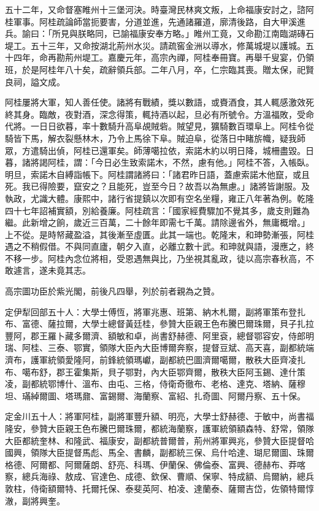 \begin{pinyinscope}
五十二年，又命督塞睢州十三堡河決。時臺灣民林爽文叛，上命福康安討之，諮阿桂軍事。阿桂疏論師當扼要害，分道並進，先通諸羅道，廓清後路，自大甲溪進兵。諭曰：「所見與朕略同，已諭福康安奉方略。」睢州工竟，又命勘江南臨湖磚石堤工。五十三年，又命按湖北荊州水災。請疏窖金洲以導水，修萬城堤以護城。五十四年，命再勘荊州堤工。嘉慶元年，高宗內禪，阿桂奉冊寶。再舉千叟宴，仍領班，於是阿桂年八十矣，疏辭領兵部。二年八月，卒，仁宗臨其喪。贈太保，祀賢良祠，謚文成。

阿桂屢將大軍，知人善任使。諸將有戰績，獎以數語，或賚酒食，其人輒感激效死終其身。臨敵，夜對酒，深念得策，輒持酒以起，旦必有所號令。方溫福敗，受命代將。一日日欲暮，率十數騎升高阜覘賊砦。賊望見，獷騎數百環阜上。阿桂令從騎皆下馬，解衣裂懸林木，乃令上馬徐下阜。賊迫阜，從落日中睹旂幟，疑我師眾，方遣騎出偵，阿桂已還軍矣。師薄噶拉依，索諾木約以明日降，城柵盡毀。日暮，諸將謁阿桂，謂：「今日必生致索諾木，不然，慮有他。」阿桂不答，入帳臥。明旦，索諾木自縛詣帳下。阿桂謂諸將曰：「諸君昨日語，蓋慮索諾木他竄，或且死。我已得險要，竄安之？且能死，豈至今日？故吾以為無慮。」諸將皆謝服。及執政，尤識大體。康熙中，諸行省提鎮以次即有空名坐糧，雍正八年著為例。乾隆四十七年詔補實額，別給養廉。阿桂疏言：「國家經費驟加不覺其多，歲支則難為繼。此新增之餉，歲近三百萬，二十餘年即需七千萬。請除邊省外，無庸概增。」上不從。是時帑藏盈溢，其後漸至虛匱。此其一端也。乾隆末，和珅勢漸張，阿桂遇之不稍假借。不與同直廬，朝夕入直，必離立數十武。和珅就與語，漫應之，終不移一步。阿桂內念位將相，受恩遇無與比，乃坐視其亂政，徒以高宗春秋高，不敢遽言，遂未竟其志。

高宗圖功臣於紫光閣，前後凡四舉，列於前者親為之贊。

定伊犁回部五十人：大學士傅恆，將軍兆惠、班第、納木札爾，副將軍策布登扎布、富德、薩拉爾，大學士總督黃廷桂，參贊大臣親王色布騰巴爾珠爾，貝子扎拉豐阿，郡王羅卜藏多爾濟、額敏和卓，尚書舒赫德、阿里袞，總督鄂容安，侍郎明瑞、阿桂、三泰、鄂實，領隊大臣內大臣博爾奔察，提督豆斌、高天喜，副都統端濟布，護軍統領愛隆阿，前鋒統領瑪巘，副都統巴圖濟爾噶爾，散秩大臣齊凌扎布、噶布舒，郡王霍集斯，貝子鄂對，內大臣鄂齊爾，散秩大臣阿玉錫、達什策凌，副都統鄂博什、溫布、由屯、三格，侍衛奇徹布、老格、達克、塔納、薩穆坦、璊綽爾圖、塔瑪鼐、富錫爾、海蘭察、富紹、扎奇圖、阿爾丹察、五十保。

定金川五十人：將軍阿桂，副將軍豐升額、明亮，大學士舒赫德、于敏中，尚書福隆安，參贊大臣親王色布騰巴爾珠爾，都統海蘭察，護軍統領額森特、舒常，領隊大臣都統奎林、和隆武、福康安，副都統普爾普，荊州將軍興兆，參贊大臣提督哈國興，領隊大臣提督馬彪、馬全、書麟，副都統三保、烏什哈達、瑚尼爾圖、珠爾格德、阿爾都、阿爾薩朗、舒亮、科瑪、伊蘭保、佛倫泰、富興、德赫布、莽喀察，總兵海祿、敖成、官達色、成德、欽保、曹順、保寧、特成額、烏爾納，總兵敦柱，侍衛額爾特、托爾托保、泰斐英阿、柏凌、達蘭泰、薩爾吉岱，佐領特爾惇澈，副將興奎。


\end{pinyinscope}

